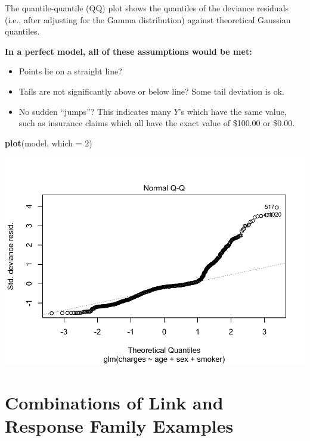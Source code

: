 \documentclass[openany]{book}
\newenvironment{Shaded}{\begin{snugshade}}{\end{snugshade}}
\newcommand{\DataTypeTok}[1]{\textcolor[rgb]{0.13,0.29,0.53}{#1}}
\newcommand{\DecValTok}[1]{\textcolor[rgb]{0.00,0.00,0.81}{#1}}
\newcommand{\KeywordTok}[1]{\textcolor[rgb]{0.13,0.29,0.53}{\textbf{#1}}}
\newcommand{\NormalTok}[1]{#1}
\providecommand{\tightlist}{%
  \setlength{\itemsep}{0pt}\setlength{\parskip}{0pt}}
\begin{document}
The quantile-quantile (QQ) plot shows the quantiles of the deviance residuals (i.e., after adjusting for the Gamma distribution) against theoretical Gaussian quantiles.

\textbf{In a perfect model, all of these assumptions would be met:}

\begin{itemize}
\tightlist
\item
  Points lie on a straight line?\\
\item
  Tails are not significantly above or below line? Some tail deviation is ok.
\item
  No sudden ``jumps''? This indicates many \(Y\)'s which have the same value, such as insurance claims which all have the exact value of \$100.00 or \$0.00.
\end{itemize}

\begin{Shaded}
\begin{Highlighting}[]
\KeywordTok{plot}\NormalTok{(model, }\DataTypeTok{which =} \DecValTok{2}\NormalTok{)}
\end{Highlighting}
\end{Shaded}

\includegraphics{05-linear-models_files/figure-latex/unnamed-chunk-18-1.pdf}

\hypertarget{combinations-of-link-and-response-family-examples}{%
\section{Combinations of Link and Response Family Examples}\label{combinations-of-link-and-response-family-examples}}
\end{document}

